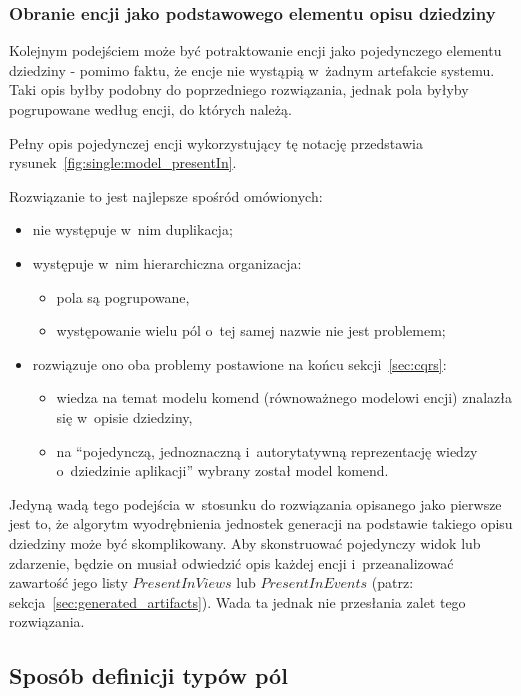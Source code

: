 \subsubsection{Obranie encji jako podstawowego elementu opisu dziedziny}

Kolejnym podejściem może być potraktowanie encji jako pojedynczego elementu dziedziny - pomimo faktu, że encje nie wystąpią w~żadnym artefakcie systemu.
Taki opis byłby podobny do poprzedniego rozwiązania, jednak pola byłyby pogrupowane według encji, do których należą.

Pełny opis pojedynczej encji wykorzystujący tę notację przedstawia rysunek~\ref{fig:single:model_presentIn}.



Rozwiązanie to jest najlepsze spośród omówionych:

\begin{itemize}
 \item nie występuje w~nim duplikacja;
 \item występuje w~nim hierarchiczna organizacja:
 \begin{itemize}
  \item pola są pogrupowane,
  \item występowanie wielu pól o~tej samej nazwie nie jest problemem;
 \end{itemize}
 \item rozwiązuje ono oba problemy postawione na końcu sekcji~\ref{sec:cqrs}:
  \begin{itemize}
   \item wiedza na temat modelu komend (równoważnego modelowi encji) znalazła się w~opisie dziedziny,
   \item na ``pojedynczą, jednoznaczną i~autorytatywną reprezentację wiedzy o~dziedzinie aplikacji'' wybrany został model komend.
  \end{itemize}
\end{itemize}

Jedyną wadą tego podejścia w~stosunku do rozwiązania opisanego jako pierwsze jest to, że algorytm wyodrębnienia jednostek generacji na podstawie takiego opisu dziedziny może być skomplikowany.
Aby skonstruować pojedynczy widok lub zdarzenie, będzie on musiał odwiedzić opis każdej encji i~przeanalizować zawartość jego listy $PresentInViews$ lub $PresentInEvents$ (patrz: sekcja~\ref{sec:generated_artifacts}).
Wada ta jednak nie przesłania zalet tego rozwiązania.


\subsection{Sposób definicji typów pól} \label{sec:field_type_definition}

